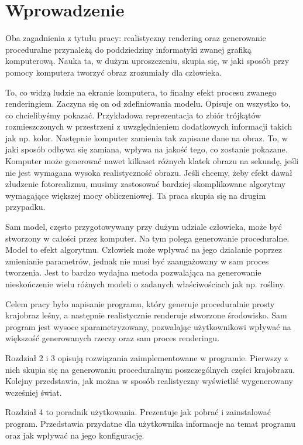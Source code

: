 \documentclass[inz,shortabstract]{iithesis}
\author         {Bartosz Rudzki}
\begin{document}
\chapter{Wprowadzenie}
    Oba zagadnienia z tytułu pracy: realistyczny rendering oraz generowanie proceduralne przynależą do poddziedziny informatyki zwanej grafiką komputerową. Nauka ta, w dużym uproszczeniu, skupia się, w jaki sposób przy pomocy komputera tworzyć obraz zrozumiały dla człowieka. 
    
    To, co widzą ludzie na ekranie komputera, to finalny efekt procesu zwanego renderingiem. Zaczyna się on od zdefiniowania modelu. Opisuje on wszystko to, co chcielibyśmy pokazać. Przykładowa reprezentacja to zbiór trójkątów rozmieszczonych w przestrzeni z uwzględnieniem dodatkowych informacji takich jak np. kolor. Następnie komputer zamienia tak zapisane dane na obraz. To, w jaki sposób odbywa się zamiana, wpływa na jakość tego, co zostanie pokazane. Komputer może generować nawet kilkaset różnych klatek obrazu na sekundę, jeśli nie jest wymagana wysoka realistyczność obrazu. Jeśli chcemy, żeby efekt dawał złudzenie fotorealizmu, musimy zastosować bardziej skomplikowane algorytmy wymagające większej mocy obliczeniowej. Ta praca skupia się na drugim przypadku.  
    
    Sam model, często przygotowywany przy dużym udziale człowieka, może być stworzony w całości przez komputer. Na tym polega generowanie proceduralne. Model to efekt algorytmu. Człowiek może wpływać na jego działanie poprzez zmienianie parametrów, jednak nie musi być zaangażowany w sam proces tworzenia. Jest to bardzo wydajna metoda pozwalająca na generowanie nieskończenie wielu różnych modeli o zadanych właściwościach jak np. rośliny.
    
    Celem pracy było napisanie programu, który generuje proceduralnie prosty krajobraz leśny, a następnie realistycznie renderuje stworzone środowisko.
    Sam program jest wysoce sparametryzowany, pozwalając użytkownikowi wpływać na większość generowanych rzeczy oraz sam proces renderingu.
    
    Rozdział 2 i 3 opisują rozwiązania zaimplementowane w programie. Pierwszy z nich skupia się na generowaniu proceduralnym poszczególnych części krajobrazu. Kolejny przedstawia, jak można w sposób realistyczny wyświetlić wygenerowany wcześniej świat.
    
    Rozdział 4 to poradnik użytkowania. Prezentuje jak pobrać i zainstalować program. Przedstawia przydatne dla użytkownika informacje na temat programu oraz jak wpływać na jego konfigurację.
    
\end{document}

